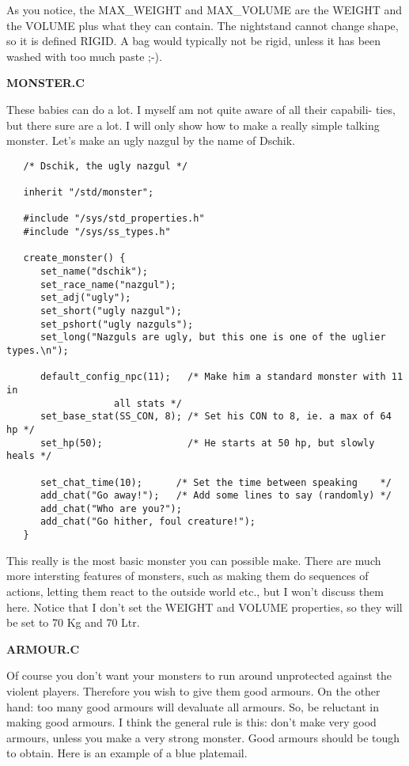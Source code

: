 As you notice, the MAX\_WEIGHT and MAX\_VOLUME are the WEIGHT and the VOLUME
plus what they can contain. The nightstand cannot change shape, so it is
defined RIGID. A bag would typically not be rigid, unless it has been washed
with too much paste ;-).

{\bf MONSTER.C}

These babies can do a lot. I myself am not quite aware of all their capabili-
ties, but there sure are a lot. I will only show how to make a really simple
talking monster. Let's make an ugly nazgul by the name of Dschik.

\begin{verbatim}
   /* Dschik, the ugly nazgul */

   inherit "/std/monster";

   #include "/sys/std_properties.h"
   #include "/sys/ss_types.h"

   create_monster() {
      set_name("dschik");
      set_race_name("nazgul");
      set_adj("ugly");
      set_short("ugly nazgul");
      set_pshort("ugly nazguls");
      set_long("Nazguls are ugly, but this one is one of the uglier types.\n");

      default_config_npc(11);   /* Make him a standard monster with 11 in
                   all stats */
      set_base_stat(SS_CON, 8); /* Set his CON to 8, ie. a max of 64 hp */
      set_hp(50);               /* He starts at 50 hp, but slowly heals */

      set_chat_time(10);      /* Set the time between speaking    */
      add_chat("Go away!");   /* Add some lines to say (randomly) */
      add_chat("Who are you?");
      add_chat("Go hither, foul creature!");
   }
\end{verbatim}

This really is the most basic monster you can possible make. There are much
more intersting features of monsters, such as making them do sequences of
actions, letting them react to the outside world etc., but I won't discuss
them here. Notice that I don't set the WEIGHT and VOLUME properties, so
they will be set to 70 Kg and 70 Ltr.

{\bf ARMOUR.C}

Of course you don't want your monsters to run around unprotected against the
violent players. Therefore you wish to give them good armours. On the other
hand: too many good armours will devaluate all armours. So, be reluctant in
making good armours. I think the general rule is this: don't make very good
armours, unless you make a very strong monster. Good armours should be tough
to obtain.
Here is an example of a blue platemail.

